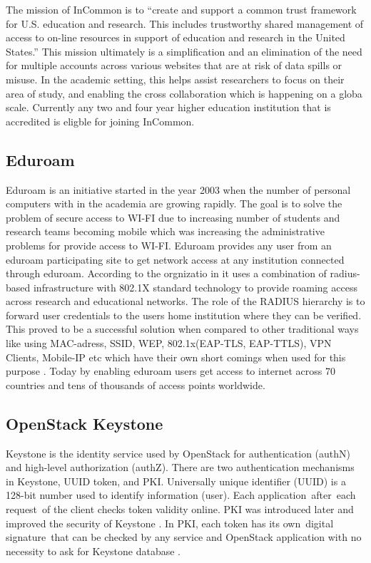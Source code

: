      The mission of InCommon is to ``create and support a common trust
     framework for U.S. education and research.  This includes
     trustworthy shared management of access to on-line resources in
     support of education and research in the United
     States.'' \cite{www-incommon} This mission ultimately is a
     simplification and an elimination of the need for multiple
     accounts across various websites that are at risk of data spills
     or misuse.  In the academic setting, this helps assist
     researchers to focus on their area of study, and enabling the
     cross collaboration which is happening on a globa scale.
     Currently any two and four year higher education institution that
     is accredited is eligble for joining InCommon.

\subsection{ Eduroam \cite{www-eduroam}}

     Eduroam is an initiative started in the year 2003 when the number
     of personal computers with in the academia are growing
     rapidly. The goal is to solve the problem of secure access to
     WI-FI due to increasing number of students and research teams
     becoming mobile which was increasing the administrative problems
     for provide access to WI-FI. Eduroam provides any user from an
     eduroam participating site to get network access at any
     institution connected through eduroam. According to the
     orgnizatio in it uses a combination of radius-based infrastructure
     with 802.1X standard technology to provide roaming access across
     research and educational networks. The role of the RADIUS
     hierarchy is to forward user credentials to the users home
     institution where they can be verified. This proved to be a
     successful solution when compared to other traditional ways like
     using MAC-adress, SSID, WEP, 802.1x(EAP-TLS, EAP-TTLS), VPN
     Clients, Mobile-IP etc which have their own short comings when
     used for this purpose \cite{eduroam-paper-2005}. Today by
     enabling eduroam users get access to internet across 70 countries
     and tens of thousands of access points worldwide.


\subsection{ OpenStack Keystone}

     \cite{www-keystone-wiki} Keystone is the identity service used
     by OpenStack for authentication (authN) and high-level
     authorization (authZ).  There are two authentication mechanisms
     in Keystone, UUID token, and PKI.  Universally unique identifier
     (UUID) is a 128-bit number used to identify information
     (user). Each application after each request of the client checks
     token validity online. PKI was introduced later and improved the
     security of Keystone \cite{cui2015security}. In PKI, each token
     has its own digital signature that can be checked by any service
     and OpenStack application with no necessity to ask for Keystone
     database \cite{www-cloudberrylab-kstn}.
 
